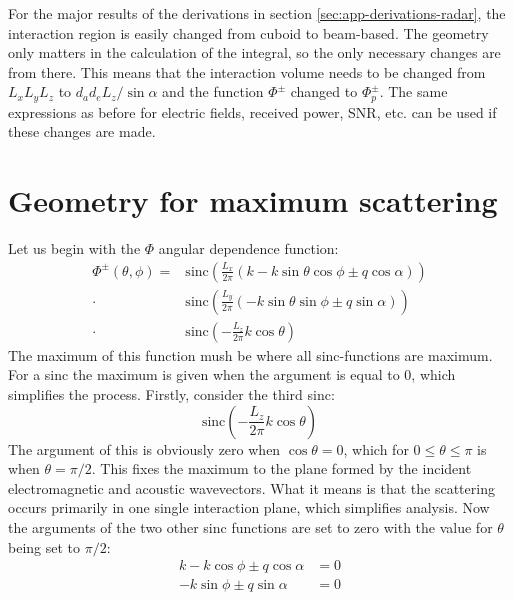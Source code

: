 \documentclass[11pt,twoside]{eitExjobb}
\begin{document}
	For the major results of the derivations in section \ref{sec:app-derivations-radar}, the interaction region is easily changed from cuboid to beam-based. The geometry only matters in the calculation of the integral, so the only necessary changes are from there. This means that the interaction volume needs to be changed from $L_x L_y L_z$ to $d_a d_e L_z/\sin{\alpha}$ and the function $\Phi^\pm$ changed to $\Phi_p^\pm$. The same expressions as before for electric fields, received power, SNR, etc. can be used if these changes are made.
	
	\section{Geometry for maximum scattering \label{sec:app-derivations-bragg}}
	Let us begin with the $\Phi$ angular dependence function:
	\begin{equation*}
	\begin{split}
		\Phi^\pm(\theta,\phi) =& \text{sinc} \left( \frac{L_x}{2\pi} \left( k - k\sin{\theta}\cos{\phi} \pm q\cos{\alpha} \right) \right) \\
		\cdot& \text{sinc} \left( \frac{L_y}{2\pi} \left( -k\sin{\theta}\sin{\phi} \pm q\sin{\alpha} \right) \right) \\
		\cdot& \text{sinc} \left( -\frac{L_z}{2\pi} k\cos{\theta} \right)
	\end{split}
	\end{equation*}
	The maximum of this function mush be where all sinc-functions are maximum. For a sinc the maximum is given when the argument is equal to 0, which simplifies the process. Firstly, consider the third sinc:
	\begin{equation*}
		\text{sinc} \left( -\frac{L_z}{2\pi} k\cos{\theta} \right)
	\end{equation*}
	The argument of this is obviously zero when $\cos{\theta} = 0$, which for $0 \leq \theta \leq \pi$ is when $\theta = \pi/2$. This fixes the maximum to the plane formed by the incident electromagnetic and acoustic wavevectors. What it means is that the scattering occurs primarily in one single interaction plane, which simplifies analysis. Now the arguments of the two other sinc functions are set to zero with the value for $\theta$ being set to $\pi/2$:
	\begin{align}
		k - k\cos{\phi} \pm q\cos{\alpha} &= 0 \label{eq:app-bragg-sinc1} \\
		-k\sin{\phi} \pm q\sin{\alpha} &= 0 \label{eq:app-bragg-sinc2}
	\end{align}
	
\end{document}
